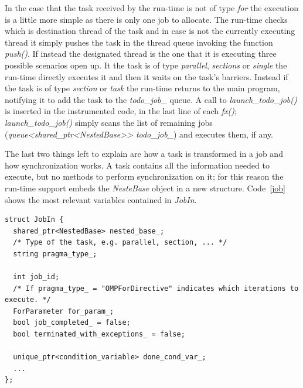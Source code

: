 \documentclass[a4paper,11pt,oneside]{book}
\begin{document}
In the case that the task received by the run-time is not of type \emph{for} the execution is a little more simple as there is only one job to allocate. The run-time checks which is destination thread of the task and in case is not the currently executing thread it simply pushes the task in the thread queue invoking the function \emph{push()}. If instead the designated thread is the one that it is executing three possible scenarios open up. It the task is of type \emph{parallel}, \emph{sections} or \emph{single} the run-time directly executes it and then it waits on the task’s barriers. Instead if the task is of type \emph{section} or \emph{task} the run-time returns to the main program, notifying it to add the task to the \emph{todo\_job\_} queue. A call to \emph{launch\_todo\_job()} is inserted in the instrumented code, in the last line of each \emph{fx()}; \emph{launch\_todo\_job()} simply scans the list of remaining jobs (\emph{queue<shared\_ptr<NestedBase>> todo\_job\_}) and executes them, if any.

The last two things left to explain are how a task is transformed in a job and how synchronization works. A task contains all the information needed to execute, but no methods to perform synchronization on it; for this reason the run-time support  embeds the \emph{NesteBase} object in a new structure. Code~\ref{job} shows the most relevant variables contained in \emph{JobIn}.

\begin{lstlisting}[language=CCC, label=jobin]
struct JobIn {
  shared_ptr<NestedBase> nested_base_;
  /* Type of the task, e.g. parallel, section, ... */
  string pragma_type_;
 
  int job_id;
  /* If pragma_type_ = "OMPForDirective" indicates which iterations to execute. */ 
  ForParameter for_param_;
  bool job_completed_ = false;
  bool terminated_with_exceptions_ = false;

  unique_ptr<condition_variable> done_cond_var_;
  ... 
};
\end{lstlisting}
\end{document}
